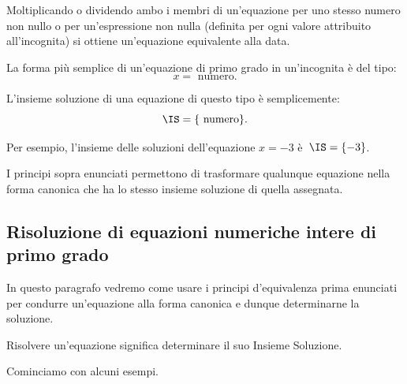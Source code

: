 \begin{principio}
 Moltiplicando o dividendo ambo i membri di
un'equazione per uno stesso numero non nullo o per
un'espressione non nulla (definita per ogni valore
attribuito all'incognita) si ottiene
un'equazione equivalente alla data.
\end{principio}


La forma più semplice di un'equazione di primo grado in
un'incognita è del tipo:
\[x = \text{ numero}.\]

L'insieme soluzione di una
equazione di questo tipo è semplicemente:
\[\IS=\{\text{ numero} \}.\]

Per esempio, l'insieme delle soluzioni dell'equazione
\(x = -3\) è~\(\IS =\{-3\}\).

I principi sopra enunciati permettono di trasformare qualunque equazione
nella forma canonica che ha lo stesso insieme soluzione di quella
assegnata.

\subsection{Risoluzione di equazioni numeriche intere di primo grado}
In questo paragrafo vedremo come usare i principi
d'equivalenza prima enunciati per condurre
un'equazione alla forma canonica e dunque determinarne
la soluzione.

\begin{definizione}
Risolvere un'equazione significa
determinare il suo Insieme Soluzione.
\end{definizione}

Cominciamo con alcuni esempi.

